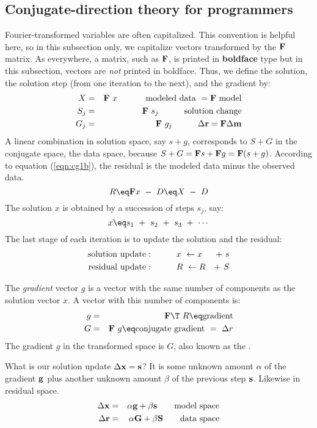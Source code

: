 \subsection{Conjugate-direction theory for programmers}
Fourier-transformed variables are often capitalized.
This convention is helpful here,
so in this subsection only,
we capitalize vectors transformed by the  $\bold F$  matrix.
As everywhere, a matrix, such as $\bold F$,
is printed in {\bf boldface} type
but in this subsection,
vectors are {\it not} printed in boldface.
Thus, we define the solution, the solution step
(from one iteration to the next),
and the gradient by:
\begin{eqnarray}
X   &=& \bold F \  x\   \quad\quad\quad  {\rm modeled\ data\ } = \bold F\ {\rm model}
\\
S_j &=& \bold F \  s_j  \quad\quad\quad  {\rm solution\ change}    \\
G_j &=& \bold F \  g_j  \quad\quad\quad  \Delta\bold r = \bold F\Delta\bold m
\end{eqnarray}
A linear combination in solution space,
say  $s+g$,  corresponds to  $S+G$  in the conjugate space, the data space,
because $S+G = \bold F s + \bold F g = \bold F(s+g)$.
According to equation 
(\ref{eqn:cg1b}),
the residual is the modeled data minus the observed data.
\begin{equation}
R \eq \bold F  x \ -\ D
  \eq          X \ -\ D
\end{equation}
The solution  $x$  is obtained by a succession of steps  $s_j$, say:
\begin{equation}
x \eq s_1 \ +\  s_2 \ +\  s_3 \ +\  \cdots
\end{equation}
The last stage of each iteration is to update the solution and the residual:
\begin{eqnarray}
\label{eqn:xupdate}
{\rm solution\ update:} \quad\quad\quad  & x \ \leftarrow  x&  +\  s\\
\label{eqn:Rupdate}
{\rm residual\ update:} \quad\quad\quad  & R \ \leftarrow  R&  +\  S
\end{eqnarray}

\par
The {\it gradient} vector $g$ is a vector with the same number
of components as the solution vector $x$.
A vector with this number of components is:
\begin{eqnarray}
g &=& \bold F\T \  R \eq \hbox{gradient}                 \label{eqn:g} \\
G &=& \bold F  \  g \eq \hbox{conjugate gradient}   \ =\ \Delta r     \label{eqn:G}
\end{eqnarray}
The gradient $g$ in the transformed space is $G$,
also known as the .
\par
What is our solution update $\Delta \bold x=\bold s$?
It is some unknown amount $\alpha$ of the gradient $\bold g$ plus
another unknown amount         $\beta$  of the previous step $\bold s$.
Likewise in residual space.
\begin{eqnarray}
\Delta \bold x &=& \alpha \bold g + \beta \bold s \quad\quad \hbox{model space}
\\
\Delta \bold r &=& \alpha \bold G + \beta \bold S \quad\quad \hbox{data space}
\end{eqnarray}

